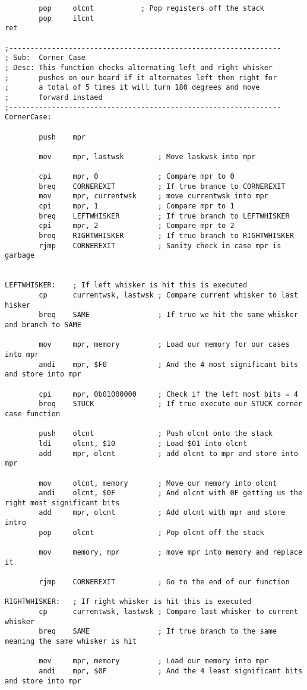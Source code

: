 \documentclass[12pt, letterpaper]{article}
\begin{document}
\begin{verbatim}
		pop		olcnt			; Pop registers off the stack
		pop		ilcnt
ret

;----------------------------------------------------------------
; Sub:	Corner Case
; Desc:	This function checks alternating left and right whisker
;		pushes on our board if it alternates left then right for
;		a total of 5 times it will turn 180 degrees and move
;		forward instaed
;----------------------------------------------------------------
CornerCase:

		push	mpr

		mov		mpr, lastwsk		; Move laskwsk into mpr

		cpi		mpr, 0				; Compare mpr to 0
		breq	CORNEREXIT			; If true brance to CORNEREXIT
		mov		mpr, currentwsk		; move currentwsk into mpr
		cpi		mpr, 1				; Compare mpr to 1
		breq	LEFTWHISKER			; If true branch to LEFTWHISKER
		cpi		mpr, 2				; Compare mpr to 2
		breq	RIGHTWHISKER		; If true branch to RIGHTWHISKER
		rjmp	CORNEREXIT			; Sanity check in case mpr is garbage


LEFTWHISKER:	; If left whisker is hit this is executed
		cp		currentwsk, lastwsk ; Compare current whisker to last hisker
		breq	SAME				; If true we hit the same whisker and branch to SAME
		
		mov		mpr, memory			; Load our memory for our cases into mpr
		andi	mpr, $F0			; And the 4 most significant bits and store into mpr

		cpi		mpr, 0b01000000		; Check if the left most bits = 4
		breq	STUCK				; If true execute our STUCK corner case function

		push	olcnt				; Push olcnt onto the stack
		ldi		olcnt, $10			; Load $01 into olcnt
		add		mpr, olcnt			; add olcnt to mpr and store into mpr
		
		mov		olcnt, memory		; Move our memory into olcnt
		andi	olcnt, $0F			; And olcnt with 0F getting us the right most significant bits
		add		mpr, olcnt			; Add olcnt with mpr and store intro
		pop		olcnt 				; Pop olcnt off the stack

		mov		memory, mpr			; move mpr into memory and replace it

		rjmp	CORNEREXIT			; Go to the end of our function

RIGHTWHISKER:	; If right whisker is hit this is executed
		cp		currentwsk, lastwsk ; Compare last whisker to current whisker
		breq	SAME				; If true branch to the same meaning the same whisker is hit

		mov		mpr, memory			; Load our memory into mpr
		andi	mpr, $0F			; And the 4 least significant bits and store into mpr


\end{verbatim}
\end{document}

